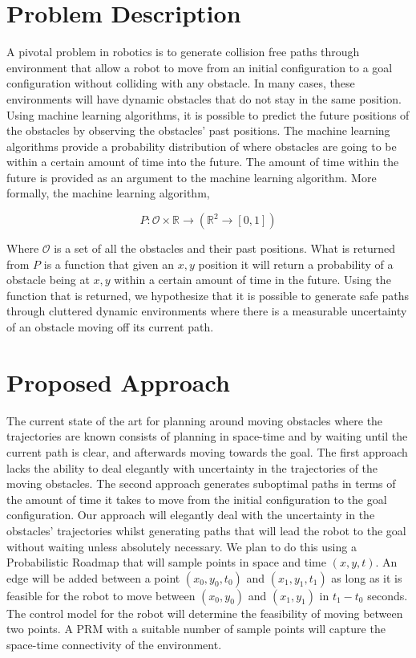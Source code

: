 \documentclass{article}
\begin{document}

\section{Problem Description}

A pivotal problem in robotics is to generate collision free paths through
environment that allow a robot to move from an initial configuration to a goal
configuration without colliding with any obstacle. In many cases, these
environments will have dynamic obstacles that do not stay in the same position.
Using machine learning algorithms, it is possible to predict the future
positions of the obstacles by observing the obstacles' past positions. The
machine learning algorithms provide a probability distribution of where
obstacles are going to be within a certain amount of time into the future.  The
amount of time within the future is provided as an argument to the machine
learning algorithm. More formally, the machine learning algorithm,

$$P: \mathcal{O} \times \mathbb{R} \rightarrow (\mathbb{R}^2 \rightarrow [0,
1])$$

Where $\mathcal{O}$ is a set of all the obstacles and their past positions.
What is returned from $P$ is a function that given an $x, y$ position it will
return a probability of a obstacle being at $x, y$ within a certain amount of
time in the future. Using the function that is returned, we hypothesize that it
is possible to generate safe paths through cluttered dynamic environments where
there is a measurable uncertainty of an obstacle moving off its current path.

\section{Proposed Approach}

The current state of the art for planning around moving obstacles where the
trajectories are known consists of planning in space-time and by waiting until
the current path is clear, and afterwards moving towards the goal. The first
approach lacks the ability to deal elegantly with uncertainty in the
trajectories of the moving obstacles. The second approach generates suboptimal
paths in terms of the amount of time it takes to move from the initial
configuration to the goal configuration. Our approach will elegantly deal with
the uncertainty in the obstacles' trajectories whilst generating paths that
will lead the robot to the goal without waiting unless absolutely necessary. We
plan to do this using a Probabilistic Roadmap that will sample points in space
and time $(x, y, t)$. An edge will be added between a point $(x_0, y_0, t_0)$
and $(x_1, y_1, t_1)$ as long as it is feasible for the robot to move between
$(x_0, y_0)$ and $(x_1, y_1)$ in $t_1 - t_0$ seconds. The control model for the
robot will determine the feasibility of moving between two points. A PRM with a
suitable number of sample points will capture the space-time connectivity of
the environment.
\end{document}
